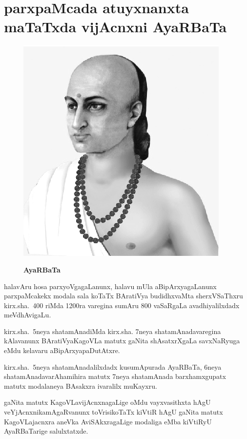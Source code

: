 \chapter{parxpaMcada atuyxnanxta maTaTxda vijAcnxni AyaRBaTa}%

\begin{figure}
  \centering\includegraphics[scale=0.8]{src/figures/aryabhata.eps}
  
  {\bf AyaRBaTa}
    \end{figure}


halavAru hosa parxyoVgagaLanunx, halavu mUla aBipArxyagaLanunx parxpaMcakekx modala sala koTaTx BAratiVya budidhxvaMta sherxVSaThxru kirx.sha.~{\rm 400} riMda {\rm 1200}ra varegina sumAru {\rm 800} vaSaRgaLa avadhiyalilxdadx meVdhAvigaLu.

kirx.sha.~{\rm 5}neya shatamAnadiMda kirx.sha. {\rm 7}neya shatamAnadavaregina kAlavanunx BAratiVya\break KagoVLa matutx gaNita shAsatxrXgaLa savxNaRyuga eMdu kelavaru aBipArxyapaDutAtxre.

kirx.sha.~{\rm 5}neya shatamAnadalilxdadx kusumApurada AyaRBaTa, {\rm 6}neya shatamAnada\break varAhamihira matutx {\rm 7}neya shatamAnada barxhamxgupatx matutx modalaneya BAsakxra ivaralilx muKayxru.

gaNita matutx KagoVLavijAcnxnagaLige oMdu vayxvasithxta hAgU veYjAcnxnikamAgaR\-vanunx toVrisikoTaTx kiVtiR hAgU gaNita matutx KagoVLajacnxra aneVka AviSAkxragaLige modaliga eMba kiVtiRyU AyaRBaTarige salulxtatxde.

